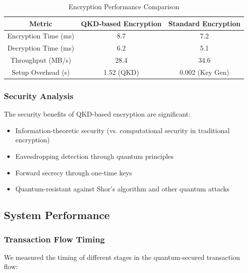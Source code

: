 \documentclass[onecolumn,a4paper,10pt]{IEEEtran}
\let\originalfloatbarrier\FloatBarrier
\renewcommand{\FloatBarrier}{\originalfloatbarrier}
\begin{document}
\begin{table}[htbp]
\centering
\begin{tabular}{|c|c|c|}
\hline
\textbf{Metric} & \textbf{QKD-based Encryption} & \textbf{Standard Encryption} \\
\hline
Encryption Time (ms) & 8.7 & 7.2 \\
\hline
Decryption Time (ms) & 6.2 & 5.1 \\
\hline
Throughput (MB/s) & 28.4 & 34.6 \\
\hline
Setup Overhead (s) & 1.52 (QKD) & 0.002 (Key Gen) \\
\hline
\end{tabular}
\caption{Encryption Performance Comparison}
\label{tab:encryption_performance}
\end{table}

\FloatBarrier %

\subsubsection{Security Analysis}
The security benefits of QKD-based encryption are significant:

\begin{itemize}
    \item Information-theoretic security (vs. computational security in traditional encryption)
    \item Eavesdropping detection through quantum principles
    \item Forward secrecy through one-time keys
    \item Quantum-resistant against Shor's algorithm and other quantum attacks
\end{itemize}

\subsection{System Performance}

\subsubsection{Transaction Flow Timing}
We measured the timing of different stages in the quantum-secured transaction flow:
\end{document}
